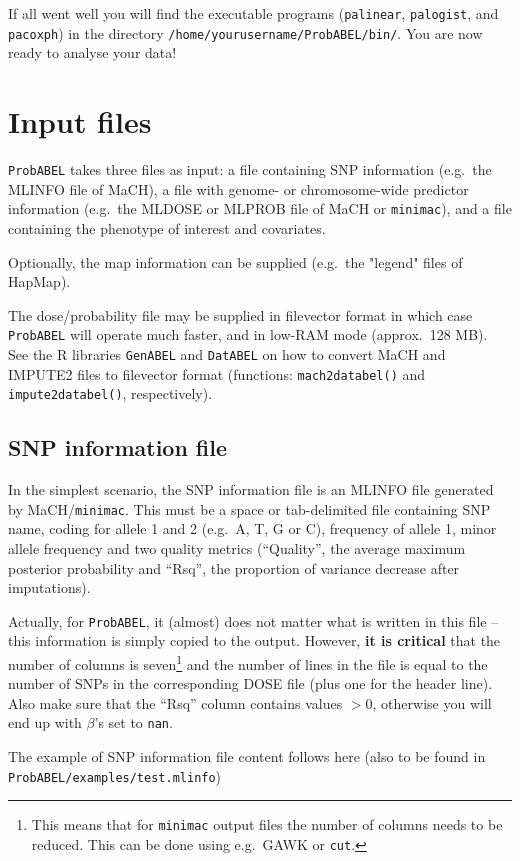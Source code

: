 \documentclass[12pt,a4paper]{article}
\newcommand{\PA}{\texttt{ProbABEL}}
\newcommand{\GA}{\texttt{GenABEL}}
\newcommand{\DA}{\texttt{DatABEL}}
\begin{document}
If all went well you will find the executable programs
(\texttt{palinear}, \texttt{palogist}, and \texttt{pacoxph}) in the
directory \texttt{/home/yourusername/ProbABEL/bin/}. You are now ready
to analyse your data!

\section{Input files}
\PA{} takes three files as input: a file containing SNP
information (e.g.~the MLINFO file of MaCH), a file with genome- or
chromosome-wide predictor information (e.g.~the MLDOSE or MLPROB file
of MaCH or \texttt{minimac}),
and a file containing the phenotype of interest and covariates.

Optionally, the map information can be supplied (e.g.~the "legend"
files of HapMap).

The dose/probability file may be supplied in filevector format
in which case \PA{} will operate much faster, and
in low-RAM mode (approx.~128 MB). See the R libraries \GA{} and
\DA{} on how to convert MaCH and IMPUTE2 files to
filevector format (functions: \texttt{mach2databel()} and
\texttt{impute2databel()}, respectively).

\subsection{SNP information file}
\label{ssec:infoin}
In the simplest scenario, the SNP information file is an MLINFO
file generated by MaCH/\texttt{minimac}. This must be a space or tab-delimited file
containing SNP name, coding for allele 1 and 2 (e.g.~A, T, G or C),
frequency of allele 1, minor allele frequency and two quality
metrics (``Quality'', the average maximum posterior probability and
``Rsq'', the proportion of variance decrease after imputations).

Actually, for \PA{}, it (almost) does not matter what is written in
this file -- this information is simply copied to the output. However,
\textbf{it is critical} that the number of columns is
seven\footnote{This means that for \texttt{minimac} output files the number of
  columns needs to be reduced. This can be done using e.g.~GAWK or
  \texttt{cut}.} and the number of lines in the file is equal to the
number of SNPs in the corresponding DOSE file (plus one for the header
line). Also make sure that the ``Rsq'' column contains values $>0$,
otherwise you will end up with $\beta$'s set to \texttt{nan}.

The example of SNP information file content follows here (also
to be found in \texttt{ProbABEL/examples/test.mlinfo})
\end{document}
